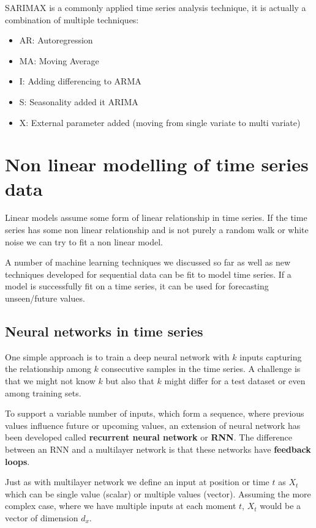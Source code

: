SARIMAX is a commonly applied time series analysis technique, it is actually a combination of multiple techniques:

\begin{itemize}
    \item AR: Autoregression
    \item MA: Moving Average
    \item I: Adding differencing to ARMA
    \item S: Seasonality added it ARIMA
    \item X: External parameter added (moving from single variate to multi variate)
\end{itemize}

\section{Non linear modelling of time series data}

Linear models assume some form of linear relationship in time series. If the time series has some non linear relationship and is not purely a random walk or white noise we can try to fit a non linear model.

A number of machine learning techniques we discussed so far as well as new techniques developed for sequential data can be fit to model time series. If a model is successfully fit on a time series, it can be used for forecasting unseen/future values.

\subsection{Neural networks in time series}

One simple approach is to train a deep neural network with \(k\) inputs capturing the relationship among \(k\) consecutive samples in the time series. A challenge is that we might not know \(k\) but also that \(k\) might differ for a test dataset or even among training sets.

To support a variable number of inputs, which form a sequence, where previous values influence future or upcoming values, an extension of neural network has been developed called \textbf{recurrent neural network} or \textbf{RNN}. The difference between an RNN and a multilayer network is that these networks have \textbf{feedback loops}.

Just as with multilayer network we define an input at position or time \(t\) as \(X_t\) which can be single value (scalar) or multiple values (vector). Assuming the more complex case, where we have multiple inputs at each moment \(t\), \(X_t\) would be a vector of dimension \(d_x\).

